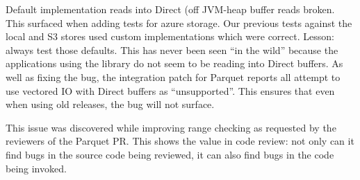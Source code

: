 \documentclass[manuscript]{acmart}
\begin{document}
Default implementation reads into Direct (off JVM-heap buffer reads broken.
This surfaced when adding tests for azure storage.
Our previous tests against the local and S3 stores used custom implementations
which were correct.
Lesson: always test those defaults.
This has never been seen ``in the wild'' because the applications
using the library do not seem to be reading into Direct buffers.
As well as fixing the bug, the integration patch for Parquet reports all
attempt to use vectored IO with Direct buffers as ``unsupported''.
This ensures that even when using old releases, the bug will not surface.

This issue was discovered while improving range checking as requested by
the reviewers of the Parquet PR.
This shows the value in code review: not only can it find bugs in
the source code being reviewed, it can also find bugs in the code being
invoked.
\end{document}
